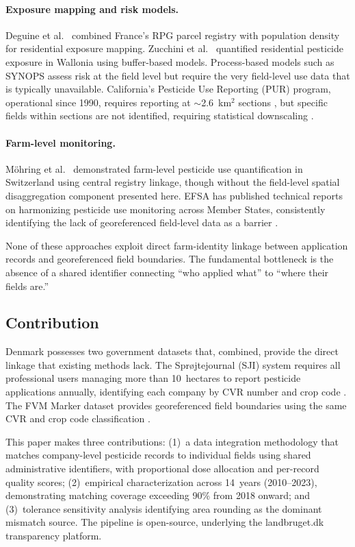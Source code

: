 \documentclass[12pt,a4paper]{article}
\begin{document}
\paragraph{Exposure mapping and risk models.} Deguine et al.\ \cite{deguine2025} combined France's RPG parcel registry with population density for residential exposure mapping. Zucchini et al.\ \cite{zucchini2024} quantified residential pesticide exposure in Wallonia using buffer-based models. Process-based models such as SYNOPS \cite{gutsche1997,strassemeyer2017} assess risk at the field level but require the very field-level use data that is typically unavailable. California's Pesticide Use Reporting (PUR) program, operational since 1990, requires reporting at $\sim$2.6~km$^2$ sections \cite{cadpr2024}, but specific fields within sections are not identified, requiring statistical downscaling \cite{larsen2017,nuckols2007}.

\paragraph{Farm-level monitoring.} M\"ohring et al.\ \cite{moehring2020} demonstrated farm-level pesticide use quantification in Switzerland using central registry linkage, though without the field-level spatial disaggregation component presented here. EFSA has published technical reports on harmonizing pesticide use monitoring across Member States, consistently identifying the lack of georeferenced field-level data as a barrier \cite{efsa2023}.

None of these approaches exploit direct farm-identity linkage between application records and georeferenced field boundaries. The fundamental bottleneck is the absence of a shared identifier connecting ``who applied what'' to ``where their fields are.''

\subsection{Contribution}

Denmark possesses two government datasets that, combined, provide the direct linkage that existing methods lack. The Spr\o jtejournal (SJI) system requires all professional users managing more than 10~hectares to report pesticide applications annually, identifying each company by CVR number and crop code \cite{mst2024}. The FVM Marker dataset provides georeferenced field boundaries using the same CVR and crop code classification \cite{lbst2024}.

This paper makes three contributions: (1)~a data integration methodology that matches company-level pesticide records to individual fields using shared administrative identifiers, with proportional dose allocation and per-record quality scores; (2)~empirical characterization across 14~years (2010--2023), demonstrating matching coverage exceeding 90\% from 2018 onward; and (3)~tolerance sensitivity analysis identifying area rounding as the dominant mismatch source. The pipeline is open-source, underlying the landbruget.dk transparency platform.
\end{document}
